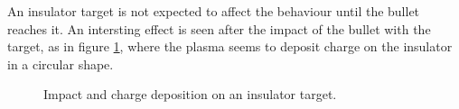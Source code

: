 An insulator target is not expected to affect the behaviour until the bullet reaches it. An intersting effect is seen after the impact of the bullet with the target, as in figure \ref{fig:elio_ins}, where the plasma seems to deposit charge on the insulator in a circular shape.
\begin{figure}
 \centering
 \hfill
 \hfill
 \caption{Impact and charge deposition on an insulator target.}
 \label{fig:elio_ins}
\end{figure}


